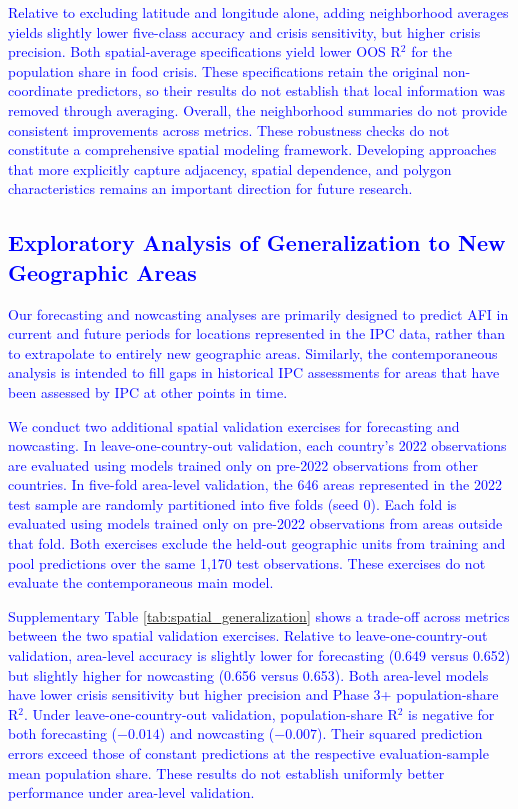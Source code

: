\documentclass[pdflatex,sn-mathphys-num]{sn-jnl}%
\theoremstyle{thmstyleone}%
\theoremstyle{thmstyletwo}%
\theoremstyle{thmstylethree}%
\begin{document}
\textcolor{blue}{Relative to excluding latitude and longitude alone, adding neighborhood averages yields slightly lower five-class accuracy and crisis sensitivity, but higher crisis precision. Both spatial-average specifications yield lower OOS R$^2$ for the population share in food crisis. These specifications retain the original non-coordinate predictors, so their results do not establish that local information was removed through averaging. Overall, the neighborhood summaries do not provide consistent improvements across metrics. These robustness checks do not constitute a comprehensive spatial modeling framework. Developing approaches that more explicitly capture adjacency, spatial dependence, and polygon characteristics remains an important direction for future research.}

\subsection*{\textcolor{blue}{Exploratory Analysis of Generalization to New Geographic Areas}}

\textcolor{blue}{Our forecasting and nowcasting analyses are primarily designed to predict AFI in current and future periods for locations represented in the IPC data, rather than to extrapolate to entirely new geographic areas. Similarly, the contemporaneous analysis is intended to fill gaps in historical IPC assessments for areas that have been assessed by IPC at other points in time.}

\textcolor{blue}{We conduct two additional spatial validation exercises for forecasting and nowcasting. In leave-one-country-out validation, each country's 2022 observations are evaluated using models trained only on pre-2022 observations from other countries. In five-fold area-level validation, the 646 areas represented in the 2022 test sample are randomly partitioned into five folds (seed 0). Each fold is evaluated using models trained only on pre-2022 observations from areas outside that fold. Both exercises exclude the held-out geographic units from training and pool predictions over the same 1,170 test observations. These exercises do not evaluate the contemporaneous main model.}

\textcolor{blue}{Supplementary Table \ref{tab:spatial_generalization} shows a trade-off across metrics between the two spatial validation exercises. Relative to leave-one-country-out validation, area-level accuracy is slightly lower for forecasting (0.649 versus 0.652) but slightly higher for nowcasting (0.656 versus 0.653). Both area-level models have lower crisis sensitivity but higher precision and Phase 3+ population-share R$^2$. Under leave-one-country-out validation, population-share R$^2$ is negative for both forecasting ($-0.014$) and nowcasting ($-0.007$). Their squared prediction errors exceed those of constant predictions at the respective evaluation-sample mean population share. These results do not establish uniformly better performance under area-level validation.}
\end{document}
